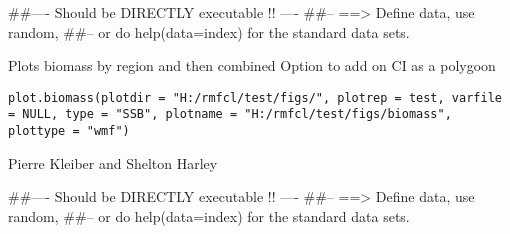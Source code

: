 \documentclass[a4paper]{book}
\begin{document}
%
\begin{Examples}
\begin{ExampleCode}
##---- Should be DIRECTLY executable !! ----
##-- ==>  Define data, use random,
##--	or do  help(data=index)  for the standard data sets.

\end{ExampleCode}
\end{Examples}
%
\begin{Description}\relax

Plots biomass by region and then combined
Option to add on CI as a polygoon
\end{Description}
%
\begin{Usage}
\begin{verbatim}
plot.biomass(plotdir = "H:/rmfcl/test/figs/", plotrep = test, varfile = NULL, type = "SSB", plotname = "H:/rmfcl/test/figs/biomass", plottype = "wmf")
\end{verbatim}
\end{Usage}
%
\begin{Arguments}
\begin{ldescription}
\item[\code{plotdir}] 


\item[\code{plotrep}] 


\item[\code{varfile}] 


\item[\code{type}] 


\item[\code{plotname}] 


\item[\code{plottype}] 


\end{ldescription}
\end{Arguments}
%
\begin{Author}\relax

Pierre Kleiber and Shelton Harley
\end{Author}
%
\begin{Examples}
\begin{ExampleCode}
##---- Should be DIRECTLY executable !! ----
##-- ==>  Define data, use random,
##--	or do  help(data=index)  for the standard data sets.

\end{ExampleCode}
\end{Examples}
\end{document}
